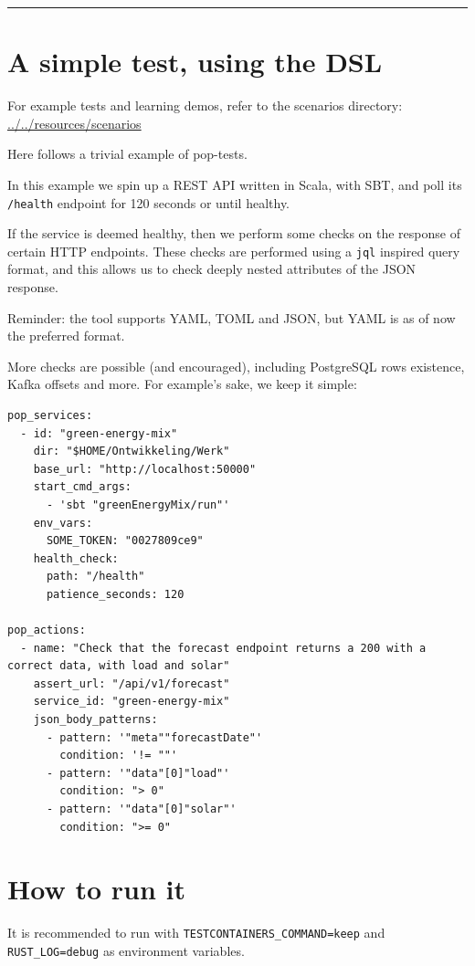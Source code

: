 \documentclass[11pt]{article}
\begin{document}
\noindent\rule{\textwidth}{0.5pt}

\section{A simple test, using the DSL}
\label{sec:orgdc4a7e9}

For example tests and learning demos, refer to the scenarios directory: \url{../../resources/scenarios}

Here follows a trivial example of pop-tests.

In this example we spin up a REST API written in Scala, with SBT, and poll its \texttt{/health} endpoint for 120 seconds or until healthy.

If the service is deemed healthy, then we perform some checks on the response of certain HTTP endpoints. These checks are performed using a \texttt{jql} inspired query format, and this allows us to check deeply nested attributes of the JSON response.

Reminder: the tool supports YAML, TOML and JSON, but YAML is as of now the preferred format.

More checks are possible (and encouraged), including PostgreSQL rows existence, Kafka offsets and more. For example's sake, we keep it simple:

\begin{verbatim}
pop_services:
  - id: "green-energy-mix"
    dir: "$HOME/Ontwikkeling/Werk"
    base_url: "http://localhost:50000"
    start_cmd_args:
      - 'sbt "greenEnergyMix/run"'
    env_vars:
      SOME_TOKEN: "0027809ce9"
    health_check:
      path: "/health"
      patience_seconds: 120

pop_actions:
  - name: "Check that the forecast endpoint returns a 200 with a correct data, with load and solar"
    assert_url: "/api/v1/forecast"
    service_id: "green-energy-mix"
    json_body_patterns:
      - pattern: '"meta""forecastDate"'
        condition: '!= ""'
      - pattern: '"data"[0]"load"'
        condition: "> 0"
      - pattern: '"data"[0]"solar"'
        condition: ">= 0"

\end{verbatim}



\section{How to run it}
\label{sec:orge5bb1b5}

It is recommended to run with \texttt{TESTCONTAINERS\_COMMAND=keep} and \texttt{RUST\_LOG=debug} as environment variables.
\end{document}
